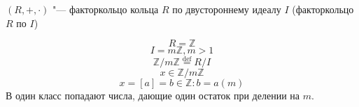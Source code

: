 \begin{Def}
	$(R, +, \cdot)$ "--- факторкольцо кольца $R$ по двустороннему
	идеалу $I$ (факторкольцо $R$ по $I$)
\end{Def}	 

\begin{exmp}
	 \[R = \mathbb{Z}\]
	 \[I = m \mathbb{Z}, m > 1\]
	 \[\mathbb{Z} /m \mathbb{Z} \overset{\text{def}}{=} R/I\]
	 \[x \in \mathbb{Z}/m\mathbb{Z}\]
	 \[x = [a] = {b \in \mathbb{Z} \colon b = a (m)}\]
	 В один класс попадают числа, 
	 дающие один остаток при делении на $m$.	 
\end{exmp}
